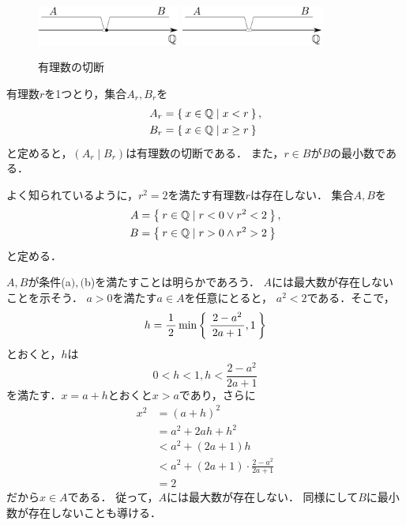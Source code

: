     \begin{figure}[h]
      \centering
      \includegraphics[width=4.7cm]{inputyou/realnumber/picture/cutrational1.pdf}
      \includegraphics[width=4.7cm]{inputyou/realnumber/picture/cutrational2.pdf}
      \caption{有理数の切断} \label{fig:cutrational}
    \end{figure}

    \begin{ex} \label{ex:cutrational}
      有理数$r$を1つとり，集合$A_r,  B_r$を
      \begin{align*}
        A_r & = \Set{ x \in \mathbb{Q} \mid x < r} , \\
        B_r & = \Set{ x \in \mathbb{Q} \mid x \geq r}
      \end{align*}
      と定めると，$(A_r \mid B_r)$は有理数の切断である．
      また，$r \in B$が$B$の最小数である．
    \end{ex}

    \begin{ex} \label{ex:cutrational2}
      よく知られているように，$r^2=2$を満たす有理数$r$は存在しない．
      集合$A,  B$を
      \begin{align*}
        A & = \Set{ r \in \mathbb{Q} \mid r < 0 \lor r^2 <2 } , \\
        B & = \Set{ r \in \mathbb{Q} \mid r>0 \land r^2>2 }
      \end{align*}
      と定める．
    
      $A,B$が条件(a$),($b)を満たすことは明らかであろう．
      $A$には最大数が存在しないことを示そう．
      $a>0$を満たす$a \in A$を任意にとると，
      $a^2<2$である．そこで，
      \[
        h = {{\, 1 \,}\over{\, 2 \,}} \min \Set{ {{\, 2-a^2 \,}\over{\, 2a+1 \,}} ,  1}
      \]
      とおくと，$h$は
      \[ 
        0<h<1 , h < \frac{2-a^2}{2a+1}
      \]
      を満たす．$x=a+h$とおくと$x>a$であり，さらに
      \begin{align*}
        x^2 & = (a+h)^2 \\
            & = a^2 +2ah + h^2 \\
            & < a^2 + (2a + 1)h \\
            & < a^2 + (2a+1) \cdot \frac{2-a^2}{2a+1} \\
            & = 2
      \end{align*}
      だから$x \in A$である．
      従って，$A$には最大数が存在しない．
      同様にして$B$に最小数が存在しないことも導ける．
    \end{ex}


